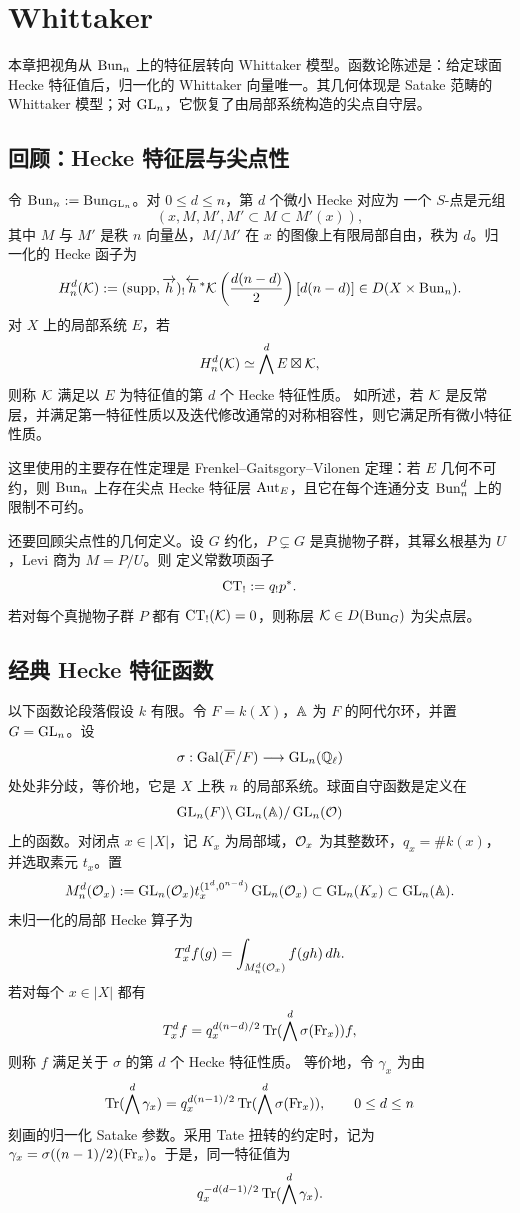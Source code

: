\chapter{Whittaker}\label{ch:3}
本章把视角从 $\operatorname{Bun}_n$ 上的特征层转向 Whittaker 模型。函数论陈述是：给定球面 Hecke 特征值后，归一化的 Whittaker 向量唯一。其几何体现是 Satake 范畴的 Whittaker 模型；对 $\operatorname{GL}_n$，它恢复了由局部系统构造的尖点自守层\cite{FGKV98,Gai18}。
\section{回顾：Hecke 特征层与尖点性}\label{sec:3.1}
令 $\operatorname{Bun}_n:=\operatorname{Bun}_{\operatorname{GL}_n}$。对 $0\le d\le n$，第 $d$ 个微小 Hecke 对应为
一个 $S$-点是元组
\[(x,M,M',M'\subset M\subset M'(x)),\]
其中 $M$ 与 $M'$ 是秩 $n$ 向量丛，$M/M'$ 在 $x$ 的图像上有限局部自由，秩为 $d$。归一化的 Hecke 函子为
\[H_n^d(\mathcal{K}):=(\operatorname{supp},\overrightarrow h)_!\overleftarrow h^*\mathcal{K}\left(\frac{d(n-d)}2\right)[d(n-d)]\in D(X\times\operatorname{Bun}_n).\]
对 $X$ 上的局部系统 $E$，若
\[H_n^d(\mathcal{K})\simeq\bigwedge^dE\boxtimes\mathcal{K},\]
则称 $\mathcal{K}$ 满足以 $E$ 为特征值的第 $d$ 个 Hecke 特征性质。
如所述，若 $\mathcal{K}$ 是反常层，并满足第一特征性质以及迭代修改通常的对称相容性，则它满足所有微小特征性质。

这里使用的主要存在性定理是 Frenkel–Gaitsgory–Vilonen 定理\cite{FGKV98}：若 $E$ 几何不可约，则 $\operatorname{Bun}_n$ 上存在尖点 Hecke 特征层 $\operatorname{Aut}_E$，且它在每个连通分支 $\operatorname{Bun}_n^d$ 上的限制不可约。

还要回顾尖点性的几何定义。设 $G$ 约化，$P\subsetneq G$ 是真抛物子群，其幂幺根基为 $U$，Levi 商为 $M=P/U$。则
定义常数项函子
\[\operatorname{CT}_!:=q_!p^*.\]
若对每个真抛物子群 $P$ 都有 $\operatorname{CT}_!(\mathcal{K})=0$，则称层 $\mathcal{K}\in D(\operatorname{Bun}_G)$ 为尖点层。
\section{经典 Hecke 特征函数}\label{sec:3.2}
以下函数论段落假设 $k$ 有限。令 $F=k(X)$，$\mathbb{A}$ 为 $F$ 的阿代尔环，并置 $G=\operatorname{GL}_n$。设
\[\sigma:\operatorname{Gal}(\overline F/F)\longrightarrow\operatorname{GL}_n(\mathbb Q_\ell)\]
处处非分歧，等价地，它是 $X$ 上秩 $n$ 的局部系统。球面自守函数是定义在
\[\operatorname{GL}_n(F)\backslash\operatorname{GL}_n(\mathbb{A})/\operatorname{GL}_n(\mathcal{O})\]
上的函数。对闭点 $x\in|X|$，记 $K_x$ 为局部域，$\mathcal{O}_x$ 为其整数环，$q_x=\#k(x)$，并选取素元 $t_x$。置
\[M_n^d(\mathcal{O}_x):=\operatorname{GL}_n(\mathcal{O}_x)t_x^{(1^d,0^{n-d})}\operatorname{GL}_n(\mathcal{O}_x)\subset\operatorname{GL}_n(K_x)\subset\operatorname{GL}_n(\mathbb{A}).\]
未归一化的局部 Hecke 算子为
\[T_x^df(g)=\int_{M_n^d(\mathcal{O}_x)}f(gh)\,dh.\]
若对每个 $x\in|X|$ 都有
\[T_x^df=q_x^{d(n-d)/2}\operatorname{Tr}(\bigwedge^d\sigma(\operatorname{Fr}_x))f,\]
则称 $f$ 满足关于 $\sigma$ 的第 $d$ 个 Hecke 特征性质。
等价地，令 $\gamma_x$ 为由
\[\operatorname{Tr}(\bigwedge^d\gamma_x)=q_x^{d(n-1)/2}\operatorname{Tr}(\bigwedge^d\sigma(\operatorname{Fr}_x)),\qquad0\le d\le n\]
刻画的归一化 Satake 参数。采用 Tate 扭转的约定时，记为 $\gamma_x=\sigma((n-1)/2)(\operatorname{Fr}_x)$。于是，同一特征值为
\[q_x^{-d(d-1)/2}\operatorname{Tr}(\bigwedge^d\gamma_x).\]

